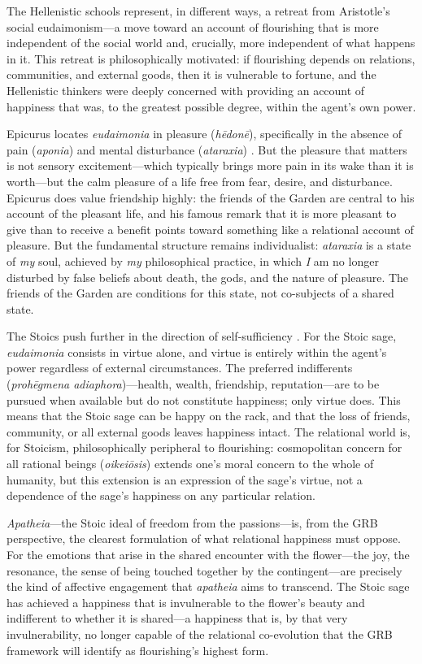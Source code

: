 \noindent
The Hellenistic schools represent, in different ways, a retreat from Aristotle's social eudaimonism---a move toward an account of flourishing that is more independent of the social world and, crucially, more independent of what happens in it. This retreat is philosophically motivated: if flourishing depends on relations, communities, and external goods, then it is vulnerable to fortune, and the Hellenistic thinkers were deeply concerned with providing an account of happiness that was, to the greatest possible degree, within the agent's own power.

Epicurus locates \emph{eudaimonia} in pleasure (\emph{h\={e}don\={e}}), specifically in the absence of pain (\emph{aponia}) and mental disturbance (\emph{ataraxia}) \parencite{epicurus1994}. But the pleasure that matters is not sensory excitement---which typically brings more pain in its wake than it is worth---but the calm pleasure of a life free from fear, desire, and disturbance. Epicurus does value friendship highly: the friends of the Garden are central to his account of the pleasant life, and his famous remark that it is more pleasant to give than to receive a benefit points toward something like a relational account of pleasure. But the fundamental structure remains individualist: \emph{ataraxia} is a state of \emph{my} soul, achieved by \emph{my} philosophical practice, in which \emph{I} am no longer disturbed by false beliefs about death, the gods, and the nature of pleasure. The friends of the Garden are conditions for this state, not co-subjects of a shared state.

The Stoics push further in the direction of self-sufficiency \parencite{marcus2002}. For the Stoic sage, \emph{eudaimonia} consists in virtue alone, and virtue is entirely within the agent's power regardless of external circumstances. The preferred indifferents (\emph{proh\={e}gmena adiaphora})---health, wealth, friendship, reputation---are to be pursued when available but do not constitute happiness; only virtue does. This means that the Stoic sage can be happy on the rack, and that the loss of friends, community, or all external goods leaves happiness intact. The relational world is, for Stoicism, philosophically peripheral to flourishing: cosmopolitan concern for all rational beings (\emph{oikei\={o}sis}) extends one's moral concern to the whole of humanity, but this extension is an expression of the sage's virtue, not a dependence of the sage's happiness on any particular relation.

\emph{Apatheia}---the Stoic ideal of freedom from the passions---is, from the GRB perspective, the clearest formulation of what relational happiness must oppose. For the emotions that arise in the shared encounter with the flower---the joy, the resonance, the sense of being touched together by the contingent---are precisely the kind of affective engagement that \emph{apatheia} aims to transcend. The Stoic sage has achieved a happiness that is invulnerable to the flower's beauty and indifferent to whether it is shared---a happiness that is, by that very invulnerability, no longer capable of the relational co-evolution that the GRB framework will identify as flourishing's highest form.


